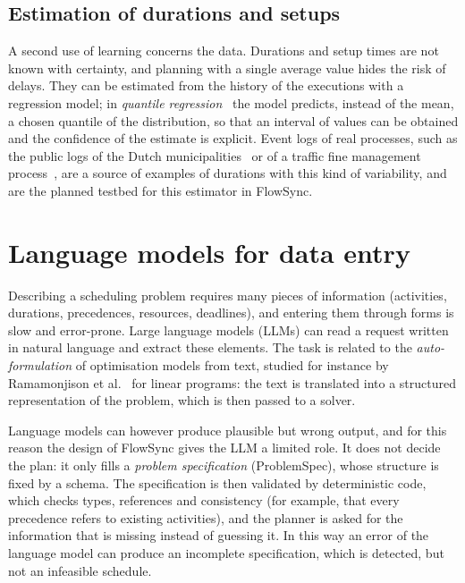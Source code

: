 \subsection{Estimation of durations and setups}

A second use of learning concerns the data. Durations and setup times are not known with
certainty, and planning with a single average value hides the risk of delays. They can be
estimated from the history of the executions with a regression model; in \emph{quantile
regression}~\cite{koenker1978} the model predicts, instead of the mean, a chosen quantile of the
distribution, so that an interval of values can be obtained and the confidence of the
estimate is explicit. Event logs of real processes, such as the public logs of the Dutch
municipalities~\cite{bpic2015} or of a traffic fine management process~\cite{roadfines}, are a source
of examples of durations with this kind of variability, and are the planned testbed for this
estimator in FlowSync.

\section{Language models for data entry}
\label{sec:llm}

Describing a scheduling problem requires many pieces of information (activities, durations,
precedences, resources, deadlines), and entering them through forms is slow and error-prone. Large
language models (LLMs) can read a request written in natural language and extract these
elements. The task is related to the \emph{auto-formulation} of optimisation models from text,
studied for instance by Ramamonjison et al.~\cite{ramamonjison2022} for linear programs: the
text is translated into a structured representation of the problem, which is then passed to a
solver.

Language models can however produce plausible but wrong output, and for this reason the design of
FlowSync gives the LLM a limited role. It does not decide the plan: it only fills a
\emph{problem specification} (ProblemSpec), whose structure is fixed by a schema. The specification is then
validated by deterministic code, which checks types, references and consistency (for example,
that every precedence refers to existing activities), and the planner is asked for the information
that is missing instead of guessing it. In this way an error of the language model
can produce an incomplete specification, which is detected, but not an infeasible schedule.

